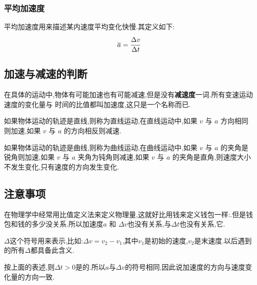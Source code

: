 \subsubsection{平均加速度}
平均加速度用来描述某内速度平均变化快慢.其定义如下:
\begin{equation}
\overline{a} =\cfrac{\Delta v }{\Delta t}
  \label{eq:average acceleration}
\end{equation}

\subsection{加速与减速的判断}

在具体的运动中,物体有可能加速也有可能减速,但是没有{\bf 减速度}一词.所有变速运动速度的变化量与
时间的比值都叫加速度,这只是一个名称而已.

如果物体运动的轨迹是直线,则称为直线运动,在直线运动中,如果 $v$ 与 $a$ 方向相同则加速,如果 $v$ 与 $a$ 的方向相反则减速.

如果物体运动的轨迹是曲线,则称为曲线运动,在曲线运动中,如果 $v$ 与 $a$ 的夹角是锐角则加速,如果 $v$ 与 $a$ 夹角为钝角则减速,如果 $v$ 与 $a$ 的夹角是直角,则速度大小不发生变化,只有速度的方向发生变化.

\subsection{注意事项}
在物理学中经常用比值定义法来定义物理量,这就好比用钱来定义钱包一样:.但是钱包和钱的多少没关系.所以加速度$a$ 和 $\Delta v$也没有关系,与$\Delta t$也没有关系,它.

$\Delta$这个符号用来表示,比如:$\Delta v =v_2 -v_1$,其中$v_1$是初始的速度,$v_2$是末速度.以后遇到的所有$\Delta$都具备此含义.

按上面的表述,则$\Delta t >0$是的.所以$a$与$\Delta v$的符号相同,因此说加速度的方向与速度变化量的方向一致.

